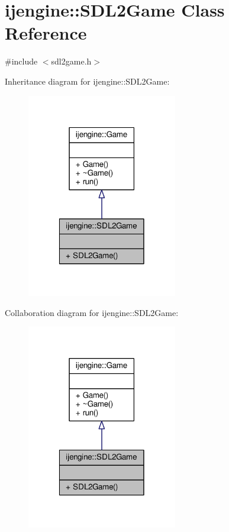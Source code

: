 \hypertarget{classijengine_1_1SDL2Game}{\section{ijengine\-:\-:S\-D\-L2\-Game Class Reference}
\label{classijengine_1_1SDL2Game}
}


{\ttfamily \#include $<$sdl2game.\-h$>$}



Inheritance diagram for ijengine\-:\-:S\-D\-L2\-Game\-:\nopagebreak
\begin{figure}[H]
\begin{center}
\leavevmode
\includegraphics[width=186pt]{classijengine_1_1SDL2Game__inherit__graph}
\end{center}
\end{figure}


Collaboration diagram for ijengine\-:\-:S\-D\-L2\-Game\-:\nopagebreak
\begin{figure}[H]
\begin{center}
\leavevmode
\includegraphics[width=186pt]{classijengine_1_1SDL2Game__coll__graph}
\end{center}
\end{figure}
